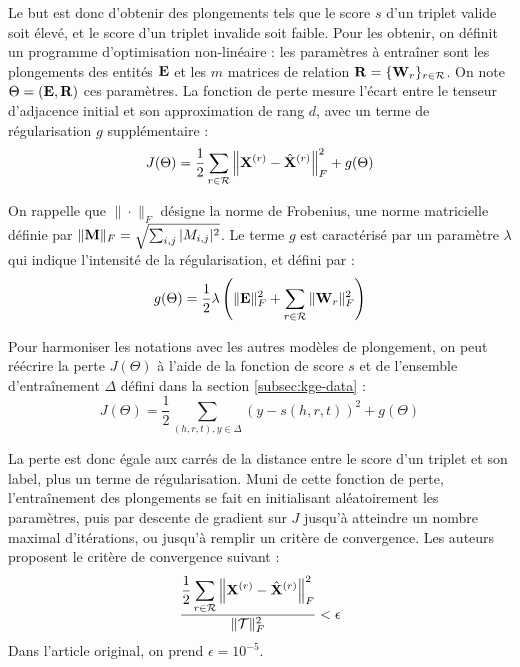 Le but est donc d'obtenir des plongements tels que le score $s$ d'un triplet valide soit élevé, et le score d'un triplet invalide soit faible. Pour les obtenir, on définit un programme d'optimisation non-linéaire : les paramètres à entraîner sont les plongements des entités $\bf{E}$ et les $m$ matrices de relation $\bf{R} = \{ \bf{W}_r \}_{r \in \Rel}$. On note $\Theta = (\bf{E}, \bf{R})$ ces paramètres. La fonction de perte mesure l'écart entre le tenseur d'adjacence initial et son approximation de rang $d$, avec un terme de régularisation $g$ supplémentaire :
\begin{equation}
    J(\Theta) = \frac{1}{2} \sum_{r \in \Rel} \left\| \bf{X}^{(r)} - \hat{\bf{X}}^{(r)} \right\|_F^2 + g(\Theta)
    \label{eq:kge-rescal-loss-function}
\end{equation}

On rappelle que $\| \cdot \|_F$ désigne la norme de Frobenius, une norme matricielle définie par $\| \bf{M} \|_F = \sqrt{\sum_{i, j} |M_{i, j}|^2}$. Le terme $g$ est caractérisé par un paramètre $\lambda$ qui indique l'intensité de la régularisation, et défini par :
\begin{equation}
    g(\Theta) = \frac{1}{2} \lambda \left( \| \bf{E} \|_F^2 + \sum_{r \in \Rel} \| \bf{W}_r \|_F^2 \right)
\end{equation}


Pour harmoniser les notations avec les autres modèles de plongement, on peut réécrire la perte $J(\Theta)$ à l'aide de la fonction de score $s$ et de 
l'ensemble d'entraînement $\Delta$ défini dans la section \ref{subsec:kge-data} : %
\begin{equation}
    J(\Theta) = \frac{1}{2} \sum_{(h, r, t), y \in \Delta} \left(y - s(h, r, t) \right)^2
    + g(\Theta)
\end{equation}

La perte est donc égale aux carrés de la distance entre le score d'un triplet et son label, plus un terme de régularisation. Muni de cette fonction de perte, l'entraînement des plongements se fait en initialisant aléatoirement les paramètres, puis par descente de gradient sur $J$ jusqu'à atteindre un nombre maximal d'itérations, ou jusqu'à remplir un critère de convergence. Les auteurs \cite{rescal} proposent le critère de convergence suivant :
\begin{equation}
    \frac{\displaystyle \frac{1}{2} \sum_{r \in \Rel} \left\| \bf{X}^{(r)} - \hat{\bf{X}}^{(r)} \right\|_F^2}{\| \cal{T} \|_F^2} < \epsilon
\end{equation}
Dans l'article original, on prend $\epsilon = 10^{-5}$.


